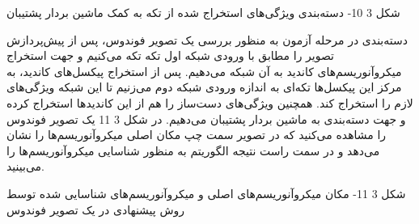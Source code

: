  
شکل ‏3 10- دسته‌بندی ویژگی‌های استخراج شده از تکه به کمک ماشین بردار پشتیبان

دسته‌بندی
در مرحله آزمون به منظور بررسی یک تصویر فوندوس، پس از پیش‌پردازش تصویر را مطابق با ورودی شبکه اول تکه تکه می‌کنیم و جهت استخراج میکروآنوریسم‌های کاندید به آن شبکه می‌دهیم. پس از استخراج پیکسل‌های کاندید، به مرکز این پیکسل‌ها تکه‌ای به اندازه ورودی شبکه دوم می‌زنیم تا این شبکه ویژگی‌های لازم را استخراج کند. همچنین ویژگی‌های دست‌ساز را هم از این کاندیدها استخراج کرده و جهت دسته‌بندی به ماشین بردار پشتیبان می‌دهیم. در شکل ‏3 11 یک تصویر فوندوس را مشاهده می‌کنید که در تصویر سمت چپ مکان اصلی میکروآنوریسم‌ها را نشان می‌دهد و در سمت راست نتیجه الگوریتم به منظور شناسایی میکروآنوریسم‌ها را می‌بینید.

 
شکل ‏3 11- مکان میکروآنوریسم‌های اصلی و میکروآنوریسم‌های شناسایی شده توسط روش پیشنهادی در یک تصویر فوندوس


